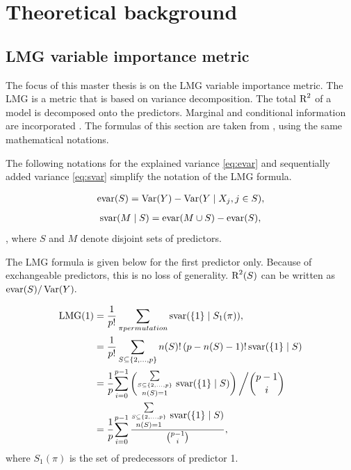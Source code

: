 \documentclass[11pt,a4paper,twoside]{book}\usepackage[]{graphicx}\usepackage[]{color}
\begin{document}
\chapter{Theoretical background} 

\section{LMG variable importance metric}

The focus of this master thesis is on the LMG variable importance metric. The LMG is a metric that is based on variance decomposition. The total $\text{R}^2$ of a model is decomposed onto the predictors. Marginal and conditional information are incorporated \citep{Gromping2015} .  The  formulas of this section are taken from \cite{Gromping2015}, using the same mathematical notations. 

The following notations for the explained variance \eqref{eq:evar} and sequentially added variance \eqref{eq:svar} simplify the notation of the LMG formula. 

   \begin{align} 
     \text{evar}(S) = \operatorname{Var}(Y) - \operatorname{Var}( Y \mid X_{j}, j \in S),   \label{eq:evar} 
   \end{align} 
   \begin{align} 
     \text{svar}(M \mid S) = \text{evar}(M \cup S) - \text{evar}(S), \label{eq:svar} 
    \end{align} , where $S$ and $M$ denote disjoint sets of predictors.
    
   The LMG formula is given below for the first predictor only. Because of exchangeable predictors, this is no loss of generality.  $\text{R}^2(S)$ can be written as $\text{evar}(S)/\operatorname{Var}(Y).$ 

   \begin{align} 
     \LMG(1) &= \frac{1}{p!} \sum_{\pi permutation}^{} \SVAR(\{1\} \mid S_{1}(\pi)),   \label{eq:lmgw1}  \\
     &= \frac{1}{p!} \sum_{S \subseteq \{ 2, \dots, p \} }^{} n(S)! \, (p-n(S)-1)! \, \SVAR(\{1\} \mid S) \label{eq:lmgw2}  \\
     &=  \cfrac{1}{p} \sum_{i=0}^{p-1} \left( \substack {\sum\limits_{ S \subseteq \{ 2, \dots, p \}}\\n(S)=1}^{} \ \SVAR(\{1\} \mid S)\right)\bigg/ \binom{p-1}{i}  \label{eq:lmgw3}  \\   
         &=  \cfrac{1}{p} \sum_{i=0}^{p-1} \frac{ \substack{\sum\limits_{ S \subseteq \{ 2, \dots, p \}}\\n(S)=1}^{} \ \SVAR(\{1\} \mid S)}{\binom{p-1}{i}}, \nonumber \\      
   \end{align}
   where $S_{1}(\pi)$ is the set of predecessors of predictor 1.
   
\end{document}
